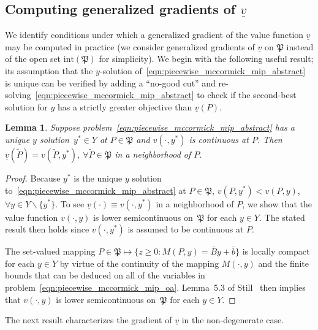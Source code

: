\documentclass{article}
\newtheorem{lemma}[theorem]{Lemma}
\begin{document}
\subsection{Computing generalized gradients of \texorpdfstring{$\underline{v}$}{the value function}}


We identify conditions under which a generalized gradient of the value function $\underline{v}$ may be computed in practice (we consider generalized gradients of $\underline{v}$ on $\mathfrak{P}$ instead of the open set $\text{int}(\mathfrak{P})$ for simplicity).
We begin with the following useful result; its assumption that the $y$-solution of~\eqref{eqn:piecewise_mccormick_mip_abstract} is unique can be verified by adding a ``no-good cut'' and re-solving~\eqref{eqn:piecewise_mccormick_mip_abstract} to check if the second-best solution for $y$ has a strictly greater objective than $\underline{v}(P)$.

\begin{lemma}
\label{lem:value_fn_active_part}
Suppose problem~\eqref{eqn:piecewise_mccormick_mip_abstract} has a unique $y$ solution~$y^* \in Y$ at $P \in \mathfrak{P}$ and $v(\cdot,y^*)$ is continuous at $P$.
Then $\underline{v}(\tilde{P}) = v(\tilde{P},y^*)$, $\forall \tilde{P} \in \mathfrak{P}$ in a neighborhood of $P$.
\end{lemma}
\begin{proof}
Because $y^*$ is the unique $y$ solution to~\eqref{eqn:piecewise_mccormick_mip_abstract} at $P \in \mathfrak{P}$, $v(P,y^*) < v(P,y)$, $\forall y \in Y \backslash \{y^*\}$.
To see $\underline{v}(\cdot) \equiv v(\cdot,y^*)$ in a neighborhood of $P$, we show that the value function $v(\cdot,y)$ is lower semicontinuous on~$\mathfrak{P}$ for each $y \in Y$.
The stated result then holds since $v(\cdot,y^*)$ is assumed to be continuous at $P$.

The set-valued mapping $P \in \mathfrak{P} \mapsto \{z \geq 0 : M(P,y) = \bar{B}y + \bar{b}\}$ is locally compact for each $y \in Y$ by virtue of the continuity of the mapping $M(\cdot,y)$ and the finite bounds that can be deduced on all of the variables in problem~\eqref{eqn:piecewise_mccormick_mip_oa}.
Lemma~5.3 of Still~\cite{still2018lectures} then implies that $v(\cdot,y)$ is lower semicontinuous on~$\mathfrak{P}$ for each $y \in Y$.
\end{proof}



The next result characterizes the gradient of $\underline{v}$ in the non-degenerate case.
\end{document}
